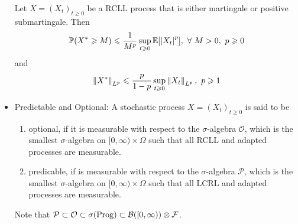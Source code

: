 \documentclass[a4paper,12pt]{article}
\begin{document}
\begin{itemize}
  \begin{thm}
    Let $X=(X_t)_{t\geqslant 0}$ be a RCLL process that is either martingale or positive submartingale. Then
    \begin{equation*}
      \mathbb{P}(X^* \geqslant M) \leqslant \frac{1}{M^p}\sup_{t \geqslant 0}\mathbb{E}[\left\lvert X_t\right\lvert^p],~\forall~M>0,~p\geqslant 0
    \end{equation*}
    and\begin{equation*}
      \left\lVert X^*\right\lVert_{L^p} \leqslant \frac{p}{1-p}\sup_{t \geqslant 0}\left\lVert X_t\right\lVert_{L^p},~p\geqslant 1
    \end{equation*}
  \end{thm}

  \item Predictable and Optional: A stochastic process $X=(X_t)_{t\geqslant 0}$ is said to be
  \begin{enumerate}[label=(\arabic*)]
    \item optional, if it is measurable with respect to the $\sigma$-algebra $\mathcal{O}$, which is the smallest $\sigma$-algebra on $[0,\infty)\times \Omega$ such that all RCLL and adapted processes are measurable.
    \item predicable, if is measurable with respect to the $\sigma$-algebra $\mathcal{P}$, which is the smallest $\sigma$-algebra on $[0,\infty)\times \Omega$ such that all LCRL and adapted processes are measurable.
  \end{enumerate}
  Note that $\mathcal{P} \subset \mathcal{O} \subset \sigma(\operatorname{Prog}) \subset \mathcal{B}([0,\infty))\otimes \mathcal{F}$.
\end{itemize}
\end{document}
